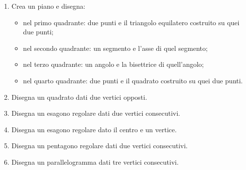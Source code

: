 \begin{enumerate} [noitemsep]
\item
Crea un piano e disegna:
\begin{itemize} [nosep]
\item nel primo quadrante: 
 due punti e il triangolo equilatero costruito su quei due punti;
\item nel secondo quadrante: 
 un segmento e l'asse di quel segmento;
\item nel terzo quadrante: 
 un angolo e la bisettrice di quell'angolo;
\item nel quarto quadrante: 
 due punti e il quadrato costruito su quei due punti.
\end{itemize}

\item Disegna un quadrato dati due vertici opposti.

\item Disegna un esagono regolare dati due vertici consecutivi.

\item Disegna un esagono regolare dato il centro e un vertice.

\item Disegna un pentagono regolare dati due vertici consecutivi.

\item Disegna un parallelogramma dati tre vertici consecutivi.
\end{enumerate}
